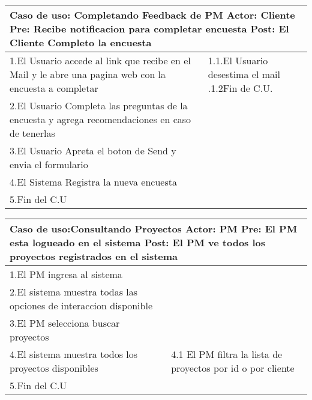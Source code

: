 \begin{longtable}{|p{}|p{}|}
    \hline
    \multicolumn{2}{|p{16cm}|}{
        \textbf{Caso de uso:} Completando Feedback de PM\newline
        \textbf{Actor:} Cliente\newline
        \textbf{Pre: }Recibe notificacion para completar encuesta\newline
        \textbf{Post: }El Cliente Completo la encuesta
    }\\
    \hline
    1.El Usuario accede al link que recibe en el Mail y le abre una pagina web con la encuesta a completar & 1.1.El Usuario desestima el mail .\newline 1.2Fin de C.U.\\
    \hline
    2.El Usuario Completa las preguntas de la encuesta y agrega recomendaciones en caso de tenerlas&    \\
    \hline
    3.El Usuario Apreta el boton de Send y envia el formulario& \\
    \hline
    4.El Sistema Registra la nueva encuesta&\\
    \hline
    5.Fin del C.U&\\
    \hline
\end{longtable}

\begin{longtable}{|p{}|p{}|}
    \hline
    \multicolumn{2}{|p{16cm}|}{
        \textbf{Caso de uso:}Consultando Proyectos\newline
        \textbf{Actor:} PM\newline
        \textbf{Pre: }El PM esta logueado en el sistema\newline
        \textbf{Post:} El PM ve todos los proyectos registrados en el sistema
    }\\
    \hline
    1.El PM ingresa al sistema& \\
    \hline
    2.El sistema muestra todas las opciones de interaccion disponible&  \\
    \hline
    3.El PM selecciona buscar proyectos& \\
    \hline
    4.El sistema muestra todos los proyectos disponibles&4.1 El PM filtra la lista de proyectos por id o por cliente\\
    \hline
    5.Fin del C.U&\\
    \hline
\end{longtable}


